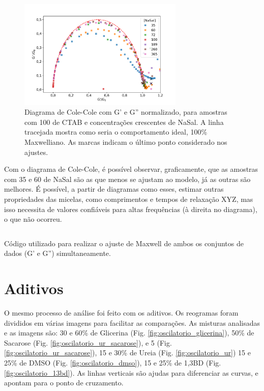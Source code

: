 		\begin{figure}
			\centering
			\includegraphics[width=0.7\textwidth]{imagens/reologia/colecole_agua}
			\caption{Diagrama de Cole-Cole com G' e G'' normalizado, para amostras com 100 \mM{} de CTAB e concentrações crescentes de NaSal. A linha tracejada mostra como seria o comportamento ideal, 100\% Maxwelliano. As marcas indicam o último ponto considerado nos ajustes.}
			\label{fig:colecole_agua}
		\end{figure}

	Com o diagrama de Cole-Cole, é possível observar, graficamente, que as amostras com 35 e 60 \mM{} de NaSal são as que menos se ajustam ao modelo, já as outras são melhores. É possível, a partir de diagramas como esses, estimar outras propriedades das micelas, como comprimentos e tempos de relaxação XYZ, mas isso necessita de valores confiáveis para altas frequências (à direita no diagrama), o que não ocorreu.  %
	
	\begin{listing}[h]
		\inputminted{python}{./python/ajuste_maxwell.py}
		\caption{Código utilizado para realizar o ajuste de Maxwell de ambos os conjuntos de dados (G' e G'') simultaneamente.}
		\label{lst:ajuste_maxwell}
	\end{listing}
	
	\FloatBarrier
	
	\section{Aditivos}
	
	O mesmo processo de análise foi feito com os aditivos. Os reogramas foram divididos em várias imagens para facilitar as comparações. As misturas analisadas e as imagens são: 30 e 60\% de Glicerina (Fig. \ref{fig:oscilatorio_glicerina}), 50\% de Sacarose (Fig. \ref{fig:oscilatorio_ur_sacarose}), e 5 (Fig. \ref{fig:oscilatorio_ur_sacarose}), 15 e 30\% de Ureia (Fig. \ref{fig:oscilatorio_ur}) 15 e 25\% de DMSO (Fig. \ref{fig:oscilatorio_dmso}), 15 e 25\% de 1,3BD (Fig. \ref{fig:oscilatorio_13bd}). As linhas verticais são ajudas para diferenciar as curvas, e apontam para o ponto de cruzamento.
	
